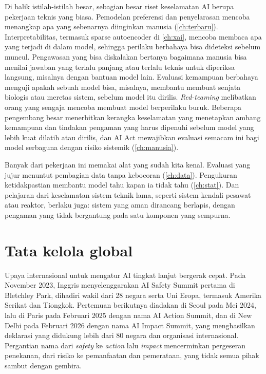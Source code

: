 Di balik istilah-istilah besar, sebagian besar riset keselamatan AI berupa pekerjaan teknis yang biasa. Pemodelan preferensi dan
penyelarasan mencoba menangkap apa yang sebenarnya diinginkan manusia (\cref{ch:terbaru}). Interpretabilitas, termasuk sparse
autoencoder di \cref{ch:xai}, mencoba membaca apa yang terjadi di dalam model, sehingga perilaku berbahaya bisa dideteksi sebelum
muncul. Pengawasan yang bisa diskalakan bertanya bagaimana manusia bisa menilai jawaban yang terlalu panjang atau terlalu teknis untuk
diperiksa langsung, misalnya dengan bantuan model lain. Evaluasi kemampuan berbahaya menguji apakah sebuah model bisa, misalnya,
membantu membuat senjata biologis atau meretas sistem, sebelum model itu dirilis. \emph{Red-teaming} melibatkan orang yang sengaja
mencoba membuat model berperilaku buruk. Beberapa pengembang besar menerbitkan kerangka keselamatan yang menetapkan ambang kemampuan
dan tindakan pengaman yang harus dipenuhi sebelum model yang lebih kuat dilatih atau dirilis, dan AI Act mewajibkan evaluasi semacam
ini bagi model serbaguna dengan risiko sistemik (\cref{ch:manusia}).

Banyak dari pekerjaan ini memakai alat yang sudah kita kenal. Evaluasi yang jujur menuntut pembagian data tanpa kebocoran
(\cref{ch:data}). Pengukuran ketidakpastian membantu model tahu kapan ia tidak tahu (\cref{ch:stat}). Dan pelajaran dari keselamatan
sistem teknik lama, seperti sistem kendali pesawat atau reaktor, berlaku juga: sistem yang aman dirancang berlapis, dengan pengaman
yang tidak bergantung pada satu komponen yang sempurna.

\section{Tata kelola global}

Upaya internasional untuk mengatur AI tingkat lanjut bergerak cepat. Pada November 2023, Inggris menyelenggarakan AI Safety Summit
pertama di Bletchley Park, dihadiri wakil dari 28 negara serta Uni Eropa, termasuk Amerika Serikat dan Tiongkok. Pertemuan berikutnya
diadakan di Seoul pada Mei 2024, lalu di Paris pada Februari 2025 dengan nama AI Action Summit, dan di New Delhi pada Februari 2026
dengan nama AI Impact Summit, yang menghasilkan deklarasi yang didukung lebih dari 80 negara dan organisasi internasional. Pergantian
nama dari \emph{safety} ke \emph{action} lalu \emph{impact} mencerminkan pergeseran penekanan, dari risiko ke pemanfaatan dan
pemerataan, yang tidak semua pihak sambut dengan gembira.

